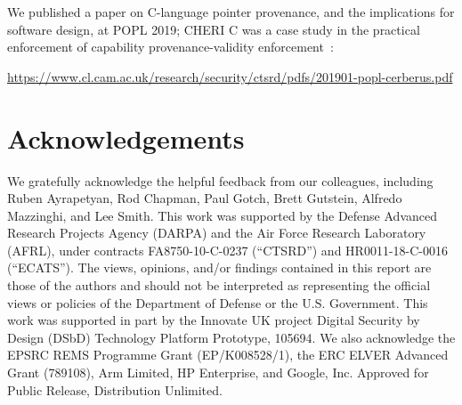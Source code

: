 \documentclass[12pt,twoside,openright,usletter]{article}
\begin{document}
\noindent
We published a paper on C-language pointer provenance, and the implications
for software design, at POPL 2019; CHERI C was a case study in the practical
enforcement of capability provenance-validity
enforcement~\cite{cerberus-popl2019}:

\smallskip
\noindent
\url{https://www.cl.cam.ac.uk/research/security/ctsrd/pdfs/201901-popl-cerberus.pdf}
\smallskip


\section{Acknowledgements}

We gratefully acknowledge the helpful feedback from our colleagues, including
Ruben Ayrapetyan, Rod Chapman, Paul Gotch,
Brett Gutstein, Alfredo Mazzinghi, and Lee Smith.
This work was supported by the Defense Advanced Research Projects Agency (DARPA) and the Air Force Research Laboratory (AFRL), under contracts
FA8750-10-C-0237 (``CTSRD'') and HR0011-18-C-0016 (``ECATS'').
The views, opinions, and/or findings contained in this report are those of the authors and should not be interpreted as representing the official views or policies of the Department of Defense or the U.S. Government.
This work was supported in part by the Innovate UK project Digital Security by
Design (DSbD) Technology Platform Prototype, 105694.
We also acknowledge the EPSRC REMS Programme Grant (EP/K008528/1), the
ERC ELVER Advanced Grant (789108), Arm Limited,
HP Enterprise, and Google, Inc.
Approved for Public Release, Distribution Unlimited.

\printbibliography
\end{document}
